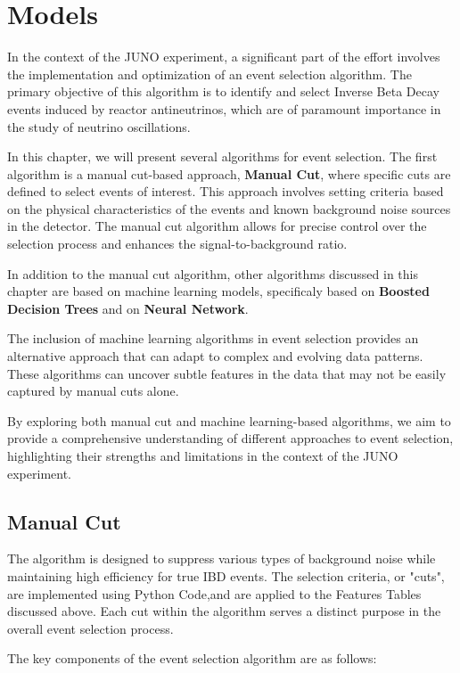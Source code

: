 \section{Models}


In the context of the JUNO experiment, a significant part of the effort involves the implementation and optimization of an event selection algorithm. The primary objective of this algorithm is to identify and select Inverse Beta Decay events induced by reactor antineutrinos, which are of paramount importance in the study of neutrino oscillations.

In this chapter, we will present several algorithms for event selection. The first algorithm is a manual cut-based approach, \textbf{Manual Cut}, where specific cuts are defined to select events of interest. This approach involves setting criteria based on the physical characteristics of the events and known background noise sources in the detector. The manual cut algorithm allows for precise control over the selection process and enhances the signal-to-background ratio.

In addition to the manual cut algorithm, other algorithms discussed in this chapter are based on machine learning models, specificaly based on \textbf{Boosted Decision Trees} and on \textbf{Neural Network}. 

The inclusion of machine learning algorithms in event selection provides an alternative approach that can adapt to complex and evolving data patterns. These algorithms can uncover subtle features in the data that may not be easily captured by manual cuts alone.

By exploring both manual cut and machine learning-based algorithms, we aim to provide a comprehensive understanding of different approaches to event selection, highlighting their strengths and limitations in the context of the JUNO experiment.

\subsection{Manual Cut}
The algorithm is designed to suppress various types of background noise while maintaining high efficiency for true IBD events. The selection criteria, or "cuts", are implemented using Python Code,and are applied to the Features Tables discussed above. Each cut within the algorithm serves a distinct purpose in the overall event selection process.

The key components of the event selection algorithm are as follows:

